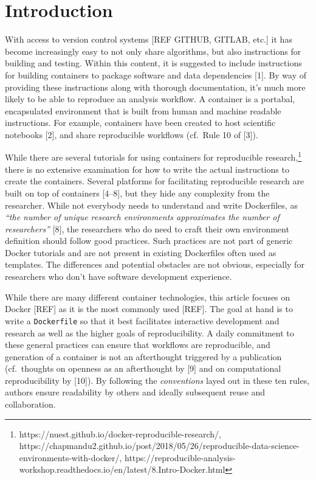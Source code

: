 \documentclass[10pt,letterpaper]{article}
\begin{document}
\linenumbers

\hypertarget{introduction}{%
\section*{Introduction}\label{introduction}}

With access to version control systems {[}REF GITHUB, GITLAB, etc.{]} it
has become increasingly easy to not only share algorithms, but also
instructions for building and testing. Within this content, it is
suggested to include instructions for building containers to package
software and data dependencies {[}1{]}. By way of providing these
instructions along with thorough documentation, it's much more likely to
be able to reproduce an analysis workflow. A container is a portabal,
encapsulated environment that is built from human and machine readable
instructions. For example, containers have been created to host
scientific notebooks {[}2{]}, and share reproducible workflows (cf.~Rule
10 of {[}3{]}).

While there are several tutorials for using containers for reproducible
research,\footnote{https://nuest.github.io/docker-reproducible-research/,
  https://chapmandu2.github.io/post/2018/05/26/reproducible-data-science-environments-with-docker/,
  https://reproducible-analysis-workshop.readthedocs.io/en/latest/8.Intro-Docker.html}
there is no extensive examination for how to write the actual
instructions to create the containers. Several platforms for
facilitating reproducible research are built on top of containers
{[}4--8{]}, but they hide any complexity from the researcher. While not
everybody needs to understand and write Dockerfiles, as \emph{``the
number of unique research environments approximates the number of
researchers''} {[}8{]}, the researchers who do need to craft their own
environment definition should follow good practices. Such practices are
not part of generic Docker tutorials and are not present in existing
Dockerfiles often used as templates. The differences and potential
obstacles are not obvious, especially for researchers who don't have
software development experience.

While there are many different container technologies, this article
focuses on Docker {[}REF{]} as it is the most commonly used {[}REF{]}.
The goal at hand is to write a \texttt{Dockerfile} so that it best
facilitates interactive development and research as well as the higher
goals of reproducibility. A daily commitment to these general practices
can ensure that workflows are reproducible, and generation of a
container is not an afterthought triggered by a publication
(cf.~thoughts on openness as an afterthought by {[}9{]} and on
computational reproducibility by {[}10{]}). By following the
\emph{conventions} layed out in these ten rules, authors ensure
readability by others and ideally subsequent reuse and collaboration.
\end{document}
